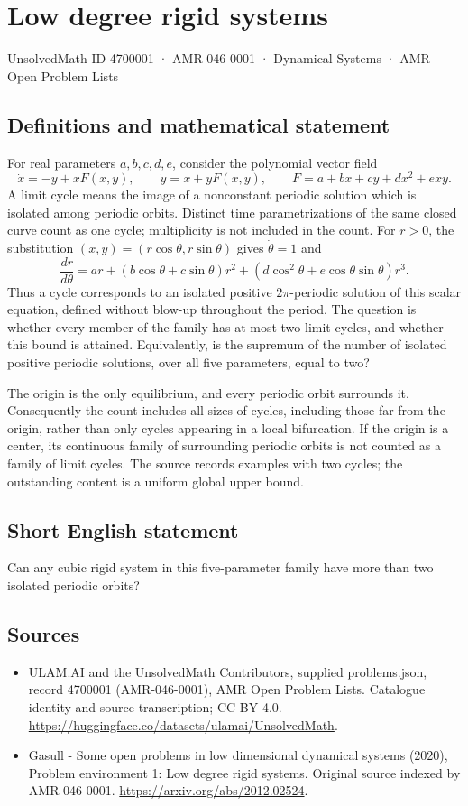 \documentclass[11pt,a4paper]{article}
\begin{document}
\section*{Low degree rigid systems}\label{4700001}
{\small UnsolvedMath ID 4700001 · AMR-046-0001 · Dynamical Systems · AMR Open Problem Lists}
\subsection{Definitions and mathematical statement}
For real parameters $a,b,c,d,e$, consider the polynomial vector field
\[
 \dot x=-y+xF(x,y),\qquad \dot y=x+yF(x,y),\qquad
 F=a+bx+cy+dx^2+exy.
\]
A limit cycle means the image of a nonconstant periodic solution which is
isolated among periodic orbits. Distinct time parametrizations of the same
closed curve count as one cycle; multiplicity is not included in the count.
For $r>0$, the substitution $(x,y)=(r\cos\theta,r\sin\theta)$ gives
$\dot\theta=1$ and
\[
 \frac{dr}{d\theta}=ar+(b\cos\theta+c\sin\theta)r^2
 +(d\cos^2\theta+e\cos\theta\sin\theta)r^3.
\]
Thus a cycle corresponds to an isolated positive $2\pi$-periodic solution of
this scalar equation, defined without blow-up throughout the period.
The question is whether every member of the family has at most two limit
cycles, and whether this bound is attained. Equivalently, is the supremum of
the number of isolated positive periodic solutions, over all five parameters,
equal to two?

The origin is the only equilibrium, and every periodic orbit surrounds it.
Consequently the count includes all sizes of cycles, including those far from
the origin, rather than only cycles appearing in a local bifurcation. If the
origin is a center, its continuous family of surrounding periodic orbits is
not counted as a family of limit cycles. The source records examples with two
cycles; the outstanding content is a uniform global upper bound.
\subsection{Short English statement}
Can any cubic rigid system in this five-parameter family have more than two isolated periodic orbits?
\subsection{Sources}
\begin{itemize}
\item[S1] ULAM.AI and the UnsolvedMath Contributors, supplied problems.json, record 4700001 (AMR-046-0001), AMR Open Problem Lists. Catalogue identity and source transcription; CC BY 4.0.
\url{https://huggingface.co/datasets/ulamai/UnsolvedMath}.
\item[S2] Gasull - Some open problems in low dimensional dynamical systems (2020), Problem environment 1: Low degree rigid systems. Original source indexed by AMR-046-0001.
\url{https://arxiv.org/abs/2012.02524}.
\end{itemize}
\end{document}
